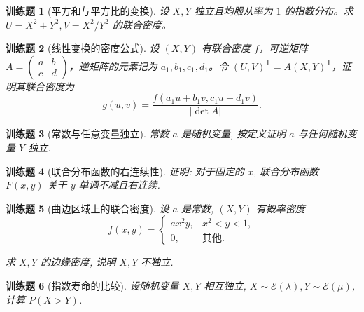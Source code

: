 \documentclass[UTF8,12pt,a4paper,fontset=fandol]{ctexbook}
\newtheorem{exercise}{训练题}[section]
\begin{document}
\begin{exercise}[平方和与平方比的变换]\label{q:Y4.34}
设 $X,Y$ 独立且均服从率为 $1$ 的指数分布。求 $U=X^2+Y^2,V=X^2/Y^2$ 的联合密度。\par{}\end{exercise}

\begin{exercise}[线性变换的密度公式]\label{q:Y4.36}
设 $(X,Y)$ 有联合密度 $f$，可逆矩阵 $A=\begin{pmatrix}a&b\\c&d\end{pmatrix}$，逆矩阵的元素记为 $a_1,b_1,c_1,d_1$。令 $(U,V)^\mathsf T=A(X,Y)^\mathsf T$，证明其联合密度为\[g(u,v)=\frac{f(a_1u+b_1v,c_1u+d_1v)}{|\det A|}.\]\par{}\end{exercise}

\begin{exercise}[常数与任意变量独立]\label{q:A4.4}
常数 $a$ 是随机变量, 按定义证明 $a$ 与任何随机变量 $Y$ 独立.\par{}\end{exercise}

\begin{exercise}[联合分布函数的右连续性]\label{q:A4.5}
证明: 对于固定的 $x$, 联合分布函数 $F(x,y)$ 关于 $y$ 单调不减且右连续.\par{}\end{exercise}

\begin{exercise}[曲边区域上的联合密度]\label{q:A4.11}
设 $a$ 是常数, $(X,Y)$ 有概率密度
    \[f(x,y)=\begin{cases}
        ax^2y, & x^2<y<1, \\
        0, & \text{其他}.
    \end{cases}\]

    求 $X,Y$ 的边缘密度, 说明 $X,Y$ 不独立.\par{}\end{exercise}

\begin{exercise}[指数寿命的比较]\label{q:A4.14}
设随机变量 $X,Y$ 相互独立, $X\sim\mathcal{E}(\lambda),Y\sim\mathcal{E}(\mu)$, 计算 $P(X>Y)$.\par{}\end{exercise}
\end{document}
